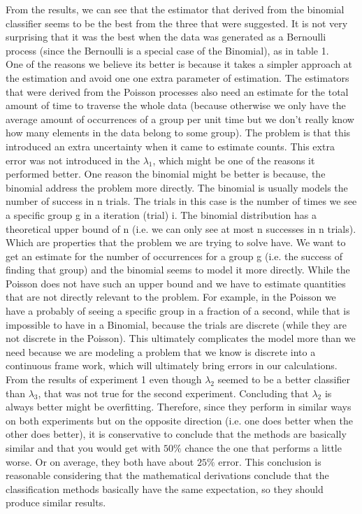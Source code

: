 \documentclass[a4paper]{article}
\begin{document}
From the results, we can see that the estimator that derived from the binomial classifier seems to be the best from the three that were suggested.
It is not very surprising that it was the best when the data was generated as a Bernoulli process (since the Bernoulli is a special case of the Binomial), as in table 1. \\
\indent One of the reasons we believe its better is because it takes a simpler approach at the estimation and avoid one one extra parameter of estimation.
The estimators that were derived from the Poisson processes also need an estimate for the total amount of time to traverse the whole data (because otherwise we only have the average amount of occurrences of a group per unit time but we don't really know how many elements in the data belong to some group).
The problem is that this introduced an extra uncertainty when it came to estimate counts. 
This extra error was not introduced in the $\lambda_1$, which might be one of the reasons it performed better.
One reason the binomial might be better is because, the binomial address the problem more directly.
The binomial is usually models the number of success in n trials.
The trials in this case is the number of times we see a specific group g in a iteration (trial) i.
The binomial distribution has a theoretical upper bound of n (i.e. we can only see at most n successes in n trials).
Which are properties that the problem we are trying to solve have.
We want to get an estimate for the number of occurrences for a group g (i.e. the success of finding that group) and the binomial seems to model it more directly.
While the Poisson does not have such an upper bound and we have to estimate quantities that are not directly relevant to the problem.
For example, in the Poisson we have a probably of seeing a specific group in a fraction of a second, while that is impossible to have in a Binomial, because the trials are discrete (while they are not discrete in the Poisson).
This ultimately complicates the model more than we need because we are modeling a problem that we know is discrete into a continuous frame work, which will ultimately bring errors in our calculations. \\
\indent From the results of experiment 1 even though $\lambda_2$ seemed to be a better classifier than $\lambda_3$,  that was not true for the second experiment. 
Concluding that $\lambda_2$ is always better might be overfitting.
Therefore, since they perform in similar ways on both experiments but on the opposite direction (i.e. one does better when the other does better), it is conservative to conclude that the methods are basically similar and that you would get with $50\%$ chance the one that performs a little worse. 
Or on average, they both have about $25\%$ error.
This conclusion is reasonable considering that the mathematical derivations conclude that the classification methods basically have the same expectation, so they should produce similar results.
\end{document}

